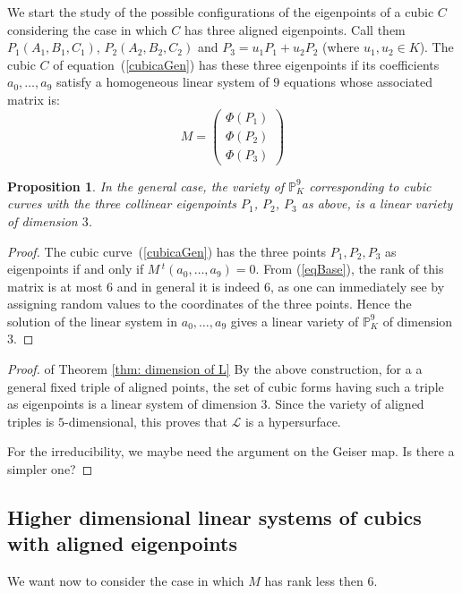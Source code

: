 \documentclass{amsart}
\theoremstyle{plain}
\newtheorem{prop}[theorem]{Proposition}
\theoremstyle{definition}
\begin{document}


We start the study of the possible configurations of the eigenpoints of a
cubic $C$ considering the case in which $C$ has three
aligned eigenpoints. Call them
$P_1(A_1, B_1, C_1)$, $P_2(A_2, B_2, C_2)$ and $P_3 = u_1P_1+u_2P_2$
(where $u_1, u_2 \in K$). The cubic $C$
of equation~(\ref{cubicaGen}) has these three eigenpoints if its coefficients
$a_0, \dots, a_9$ satisfy a homogeneous linear system of $9$
equations whose associated matrix is:
\begin{equation}
M = \left(
\begin{array}{c}
  \Phi(P_1) \\
  \Phi(P_2) \\
  \Phi(P_3)
\end{array}
\right)
\label{matriceM}
\end{equation}
\begin{prop} 
  In the general case, the variety of $\mathbb{P}^9_K$ corresponding to
  cubic curves with the three collinear eigenpoints $P_1$, $P_2$, $P_3$
  as above, is a linear variety of dimension $3$. 
\end{prop}
\begin{proof}
The cubic curve~(\ref{cubicaGen}) has the three
points $P_1, P_2, P_3$ as eigenpoints 
if and only if $M\, {}^t\! (a_0, \dots, a_9) = 0$. {From} (\ref{eqBase}),
the rank of this matrix is at most $6$ and in general it is indeed $6$,
as one can immediately see by assigning random values to the coordinates
of the three points. Hence the solution  of the linear system in
$a_0, \dots, a_9$ gives a linear variety of $\mathbb{P}^9_K$ of dimension
$3$.
\end{proof}

\begin{proof} of Theorem \ref{thm: dimension of L}
By the above construction, for a a general fixed triple of aligned points, the set of cubic forms having such a triple as eigenpoints is a linear system of dimension $3$. Since the variety of aligned triples is $5$-dimensional, this proves that $\mathcal{L}$ is a hypersurface.

For the irreducibility, we maybe need the argument on the Geiser map. Is there a simpler one?
\end{proof}


\subsection{Higher dimensional linear systems of cubics with aligned eigenpoints}
We want now to consider the case in which $M$ has rank less then $6$.
\end{document}
